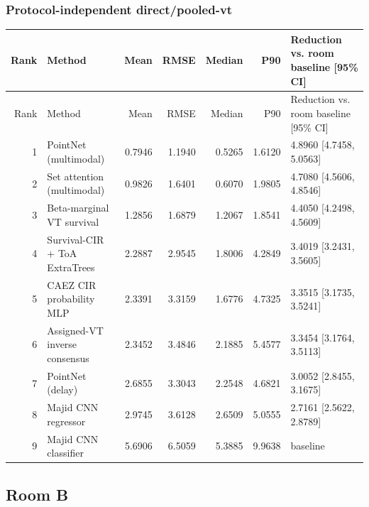 \subsubsection{Protocol-independent direct/pooled-vt}
\begingroup\scriptsize\setlength{\tabcolsep}{3.2pt}
\begin{longtable}{@{}r p{.28\linewidth} r r r r p{.23\linewidth}@{}}
\toprule Rank & Method & Mean & RMSE & Median & P90 & Reduction vs. room baseline [95\% CI] \\
\midrule\endfirsthead
\toprule Rank & Method & Mean & RMSE & Median & P90 & Reduction vs. room baseline [95\% CI] \\
\midrule\endhead
1 & PointNet (multimodal) & 0.7946 & 1.1940 & 0.5265 & 1.6120 & 4.8960 [4.7458, 5.0563] \\
2 & Set attention (multimodal) & 0.9826 & 1.6401 & 0.6070 & 1.9805 & 4.7080 [4.5606, 4.8546] \\
3 & Beta-marginal VT survival & 1.2856 & 1.6879 & 1.2067 & 1.8541 & 4.4050 [4.2498, 4.5609] \\
4 & Survival-CIR + ToA ExtraTrees & 2.2887 & 2.9545 & 1.8006 & 4.2849 & 3.4019 [3.2431, 3.5605] \\
5 & CAEZ CIR probability MLP & 2.3391 & 3.3159 & 1.6776 & 4.7325 & 3.3515 [3.1735, 3.5241] \\
6 & Assigned-VT inverse consensus & 2.3452 & 3.4846 & 2.1885 & 5.4577 & 3.3454 [3.1764, 3.5113] \\
7 & PointNet (delay) & 2.6855 & 3.3043 & 2.2548 & 4.6821 & 3.0052 [2.8455, 3.1675] \\
8 & Majid CNN regressor & 2.9745 & 3.6128 & 2.6509 & 5.0555 & 2.7161 [2.5622, 2.8789] \\
9 & Majid CNN classifier & 5.6906 & 6.5059 & 5.3885 & 9.9638 & baseline \\
\bottomrule
\end{longtable}\endgroup
\subsection{Room B}
